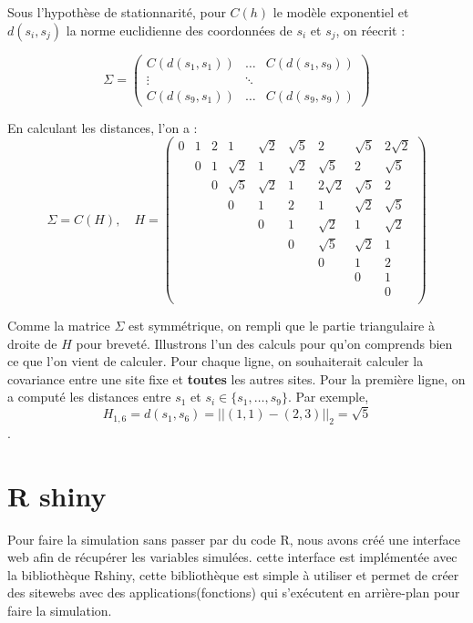 \documentclass[10pt]{article} %
\begin{document}
Sous l'hypothèse de stationnarité, pour $C(h)$ le modèle exponentiel et $d(s_i, s_j)$ la norme euclidienne des coordonnées
de $s_i$ et $s_j$, on réecrit :

$$
\Sigma =
\begin{pmatrix}
    C(d(s_1, s_1)) & \dots & C(d(s_1, s_9)) \\
    \vdots & \ddots & \\
    C(d(s_9, s_1)) & \dots & C(d(s_9, s_9))
\end{pmatrix}
$$

En calculant les distances, l'on a :
$$
\Sigma = C(H), \quad H =
\begin{pmatrix}
    0 & 1 & 2 & 1 & \sqrt{2} & \sqrt{5} & 2 & \sqrt{5} & 2\sqrt{2} \\
     & 0 & 1 & \sqrt{2} & 1 & \sqrt{2} & \sqrt{5} & 2 & \sqrt{5} \\
     &  & 0 & \sqrt{5} & \sqrt{2} & 1 & 2\sqrt{2} & \sqrt{5} & 2\\
     & & & 0 & 1 & 2 & 1 & \sqrt{2} & \sqrt{5} \\
     & & & & 0 & 1 & \sqrt{2} & 1 & \sqrt{2} \\
     & & & & & 0 & \sqrt{5} & \sqrt{2} & 1 \\
     & & & & & & 0 & 1 & 2 \\
     & & & & & & & 0 & 1 \\
     & & & & & & & & 0 \\
\end{pmatrix}
$$

Comme la matrice $\Sigma$ est symmétrique, on rempli que le partie triangulaire à droite de $H$ pour breveté. Illustrons l'un des calculs pour qu'on comprends
bien ce que l'on vient de calculer. Pour chaque ligne, on souhaiterait calculer la covariance entre une site fixe et \textbf{toutes} les autres sites.
Pour la première ligne, on a computé les distances entre $s_1$ et $s_i \in \{s_1, \dots, s_9\}$. Par exemple, $$H_{1, 6} = d(s_1, s_6) = ||(1, 1) - (2, 3)||_2 = \sqrt{5}$$.
\section{R shiny}

Pour faire la simulation sans passer par du code R, nous avons créé une interface web afin de récupérer les variables simulées.
cette interface est implémentée avec la bibliothèque Rshiny, cette bibliothèque est simple à utiliser et permet de créer des sitewebs
avec des applications(fonctions) qui s'exécutent en arrière-plan pour faire la simulation.
\end{document}
